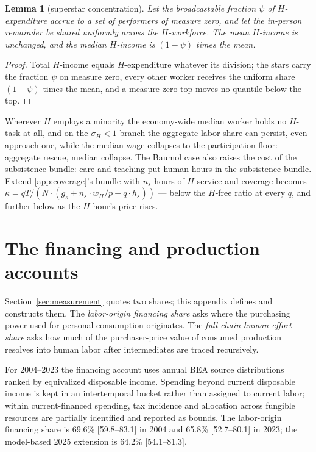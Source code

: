 \documentclass[12pt]{article}
\theoremstyle{plain}
\newtheorem{lemma}[proposition]{Lemma}
\begin{document}
\begin{lemma}[superstar concentration]\label{lem:superstar}
Let the broadcastable fraction $\psi$ of $H$-expenditure accrue to a set of performers of measure zero, and let the in-person remainder be shared uniformly across the $H$-workforce. The mean $H$-income is unchanged, and the median $H$-income is $(1-\psi )$ times the mean.
\end{lemma}

\begin{proof}
Total $H$-income equals $H$-expenditure whatever its division; the stars carry the fraction $\psi$ on measure zero, every other worker receives the uniform share $(1-\psi )$ times the mean, and a measure-zero top moves no quantile below the top.
\end{proof}

Wherever $H$ employs a minority the economy-wide median worker holds no $H$-task at all, and on the $\sigma _H < 1$ branch the aggregate labor share can persist, even approach one, while the median wage collapses to the participation floor: aggregate rescue, median collapse. The Baumol case also raises the cost of the subsistence bundle: care and teaching put human hours in the subsistence bundle. Extend \ref{app:coverage}'s bundle with $n_s$ hours of $H$-service and coverage becomes $\kappa = qT/(N\cdot (g_s + n_s\cdot w_H/p + q\cdot h_s))$ --- below the $H$-free ratio at every $q$, and further below as the $H$-hour's price rises.

\section{The financing and production accounts}\label{app:effort}

Section~\ref{sec:measurement} quotes two shares; this appendix defines and constructs them. The \emph{labor-origin financing share} asks where the purchasing power used for personal consumption originates. The \emph{full-chain human-effort share} asks how much of the purchaser-price value of consumed production resolves into human labor after intermediates are traced recursively.

For 2004--2023 the financing account uses annual BEA source distributions ranked by equivalized disposable income. Spending beyond current disposable income is kept in an intertemporal bucket rather than assigned to current labor; within current-financed spending, tax incidence and allocation across fungible resources are partially identified and reported as bounds. The labor-origin financing share is 69.6\% [59.8--83.1] in 2004 and 65.8\% [52.7--80.1] in 2023; the model-based 2025 extension is 64.2\% [54.1--81.3].
\end{document}
